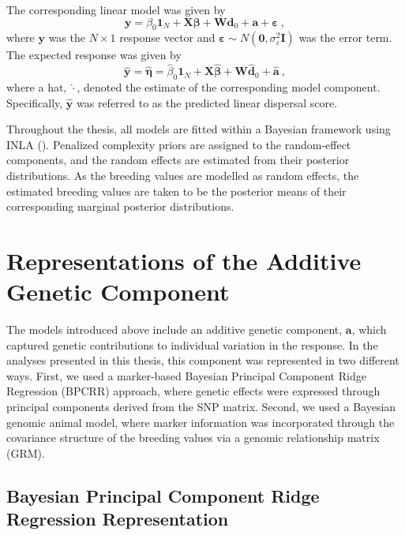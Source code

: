 The corresponding linear model was given by
%
\begin{equation}
\label{eq:method_gauss_mod_matrix}
\mathbf{y}
=
\beta_0 \mathbf{1}_N
+
\mathbf{X}\boldsymbol{\beta}
+
\mathbf{W}\mathbf{d}_0
+
\mathbf{a}
+
\boldsymbol{\varepsilon} \ ,
\end{equation}
%
where $\mathbf{y}$ was the $N \times 1$ response vector and $\boldsymbol{\varepsilon}\sim N(\mathbf{0}, \sigma^2_\varepsilon \mathbf{I}) $ was the error term.  
%
The expected response was given by
%
\begin{equation}
\label{eq:method_gauss_est_matrix}
\hat{\mathbf{y}}
=
\hat{\boldsymbol{\eta}}
=
\hat{\beta}_0 \mathbf{1}_N
+
\mathbf{X}\hat{\boldsymbol{\beta}}
+
\mathbf{W}\hat{\mathbf{d}}_0
+
\hat{\mathbf{a}} \ ,
\end{equation}
%
where a hat, $\hat{\cdot}$, denoted the estimate of the corresponding model component. 
Specifically, $\hat{\mathbf{y}}$ was referred to as the predicted linear dispersal score.

Throughout the thesis, all models are fitted within a Bayesian framework using INLA 
(\cite{rue_approximate_2009}). Penalized complexity priors are assigned to the random-effect components, and the random effects are estimated from their posterior distributions. As the breeding values are modelled as random effects, the estimated breeding values are taken to be the posterior means of their corresponding marginal posterior distributions.  


\section{Representations of the Additive Genetic Component}

The models introduced above include an additive genetic component, $\mathbf{a}$, which captured genetic contributions to individual variation in the response. In the analyses presented in this thesis, this component was represented in two different ways. First, we used a marker-based Bayesian Principal Component Ridge Regression (BPCRR) approach, where genetic effects were expressed through principal components derived from the SNP matrix. Second, we used a Bayesian genomic animal model, where marker information was incorporated through the covariance structure of the breeding values via a genomic relationship matrix (GRM).

\subsection{Bayesian Principal Component Ridge Regression Representation}

